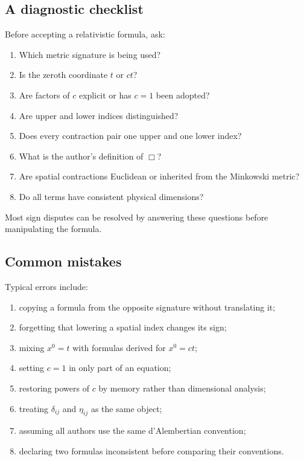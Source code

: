 \subsection{A diagnostic checklist}

Before accepting a relativistic formula, ask:

\begin{enumerate}
    \item Which metric signature is being used?
    \item Is the zeroth coordinate \(t\) or \(ct\)?
    \item Are factors of \(c\) explicit or has \(c=1\) been adopted?
    \item Are upper and lower indices distinguished?
    \item Does every contraction pair one upper and one lower index?
    \item What is the author's definition of \(\Box\)?
    \item Are spatial contractions Euclidean or inherited from the Minkowski metric?
    \item Do all terms have consistent physical dimensions?
\end{enumerate}

Most sign disputes can be resolved by answering these questions before manipulating the formula.

\subsection{Common mistakes}

Typical errors include:

\begin{enumerate}
    \item copying a formula from the opposite signature without translating it;
    \item forgetting that lowering a spatial index changes its sign;
    \item mixing \(x^{0}=t\) with formulas derived for \(x^{0}=ct\);
    \item setting \(c=1\) in only part of an equation;
    \item restoring powers of \(c\) by memory rather than dimensional analysis;
    \item treating \(\delta_{ij}\) and \(\eta_{ij}\) as the same object;
    \item assuming all authors use the same d'Alembertian convention;
    \item declaring two formulas inconsistent before comparing their conventions.
\end{enumerate}

